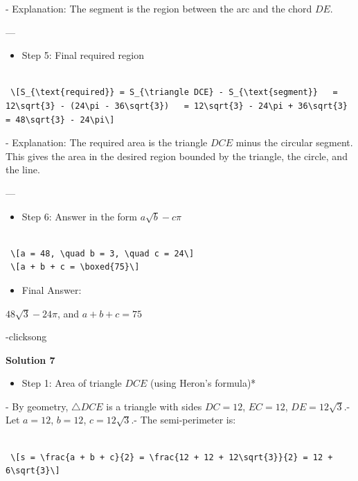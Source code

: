 \begin{enumerate}
- Explanation: The segment is the region between the arc and the chord $DE$.

 ---

 
            \begin{itemize}
        \item Step 5: Final required region
            \end{itemize}
            \begin{verbatim}

 \[S_{\text{required}} = S_{\triangle DCE} - S_{\text{segment}}   = 12\sqrt{3} - (24\pi - 36\sqrt{3})   = 12\sqrt{3} - 24\pi + 36\sqrt{3}   = 48\sqrt{3} - 24\pi\]
\end{verbatim}

- Explanation: The required area is the triangle $DCE$ minus the circular segment. This gives the area in the desired region bounded by the triangle, the circle, and the line.

 ---

 
            \begin{itemize}
        \item Step 6: Answer in the form $a\sqrt{b} - c\pi$
            \end{itemize}
            \begin{verbatim}

 \[a = 48, \quad b = 3, \quad c = 24\] 
 \[a + b + c = \boxed{75}\]
\end{verbatim}


            \begin{itemize}
        \item Final Answer:
            \end{itemize}
            $48\sqrt{3} - 24\pi$, and $a + b + c = \boxed{75}$

 -clicksong

 



\textbf{Solution 7}


            \begin{itemize}
        \item Step 1: Area of triangle $DCE$ (using Heron's formula)*
            \end{itemize}
            - By geometry, $\triangle DCE$ is a triangle with sides $DC = 12$, $EC = 12$, $DE = 12\sqrt{3}$.- Let $a = 12$, $b = 12$, $c = 12\sqrt{3}$.- The semi-perimeter is:

 \begin{verbatim}

 \[s = \frac{a + b + c}{2} = \frac{12 + 12 + 12\sqrt{3}}{2} = 12 + 6\sqrt{3}\]
\end{verbatim}


\end{enumerate}
